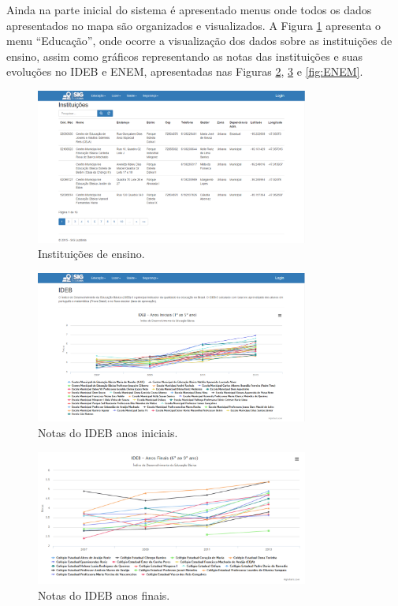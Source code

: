 \newpage

Ainda na parte inicial do sistema é apresentado menus onde todos os dados apresentados no mapa são organizados e visualizados. A Figura \ref{fig:Instituicoes} apresenta o menu “Educação”, onde ocorre a visualização dos dados sobre as instituições de ensino, assim como gráficos representando as notas das instituições e suas evoluções no IDEB e ENEM, apresentadas nas Figuras \ref{fig:IDEBInicial}, \ref{fig:IDEBFinal} e \ref{fig:ENEM}.

\begin{figure}[h]
\centering
\includegraphics[width=0.80\textwidth]{./img/cap_IV/9-Instituicoes}
\caption{Instituições de ensino.}
\label{fig:Instituicoes}
\end{figure}

\begin{figure}[h]
\centering
\includegraphics[width=0.80\textwidth]{./img/cap_IV/10-IDEBInicial}
\caption{Notas do IDEB anos iniciais.}
\label{fig:IDEBInicial}
\end{figure}

\newpage

\begin{figure}[h]
\centering
\includegraphics[width=0.80\textwidth]{./img/cap_IV/11-IDEBFinal}
\caption{Notas do IDEB anos finais.}
\label{fig:IDEBFinal}
\end{figure}

